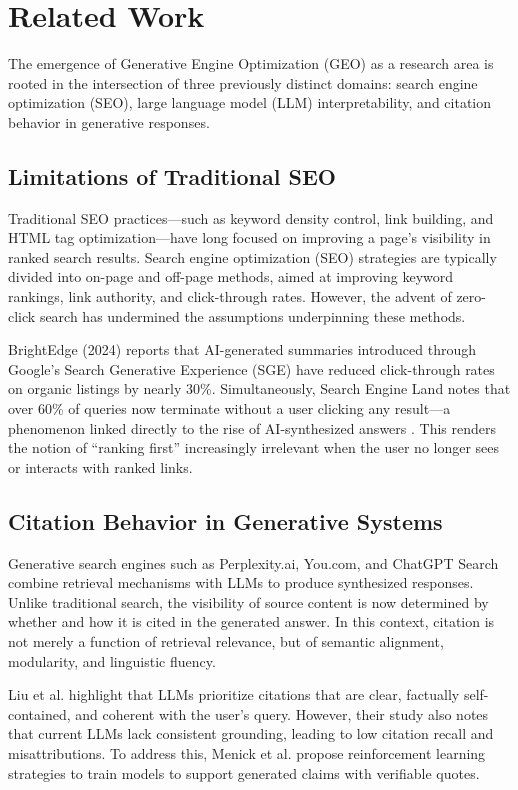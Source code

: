 \section{Related Work}

The emergence of Generative Engine Optimization (GEO) as a research area is rooted in the intersection of three previously distinct domains: search engine optimization (SEO), large language model (LLM) interpretability, and citation behavior in generative responses.

\subsection{Limitations of Traditional SEO}

Traditional SEO practices—such as keyword density control, link building, and HTML tag optimization—have long focused on improving a page’s visibility in ranked search results. Search engine optimization (SEO) strategies are typically divided into on-page and off-page methods, aimed at improving keyword rankings, link authority, and click-through rates.
However, the advent of zero-click search has undermined the assumptions underpinning these methods.

BrightEdge (2024) reports that AI-generated summaries introduced through Google’s Search Generative Experience (SGE) have reduced click-through rates on organic listings by nearly 30\%. Simultaneously, Search Engine Land notes that over 60\% of queries now terminate without a user clicking any result—a phenomenon linked directly to the rise of AI-synthesized answers \cite{lodolce2024gartner}. This renders the notion of “ranking first” increasingly irrelevant when the user no longer sees or interacts with ranked links.

\subsection{Citation Behavior in Generative Systems}

Generative search engines such as Perplexity.ai, You.com, and ChatGPT Search combine retrieval mechanisms with LLMs to produce synthesized responses. Unlike traditional search, the visibility of source content is now determined by whether and how it is cited in the generated answer. In this context, citation is not merely a function of retrieval relevance, but of semantic alignment, modularity, and linguistic fluency.

Liu et al. \cite{liu2023verifiability} highlight that LLMs prioritize citations that are clear, factually self-contained, and coherent with the user’s query. However, their study also notes that current LLMs lack consistent grounding, leading to low citation recall and misattributions. To address this, Menick et al. \cite{menick2022quotes} propose reinforcement learning strategies to train models to support generated claims with verifiable quotes.

